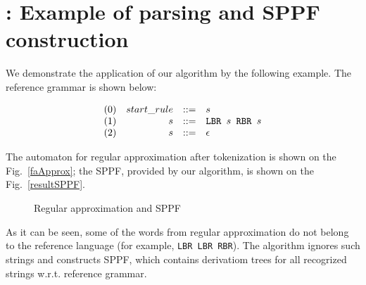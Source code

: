 \appendix

\section{\appendixname: Example of parsing and SPPF construction}\label{example}

We demonstrate the application of our algorithm by the following example. The reference grammar is shown below:

$$
\begin{array}{crcl}
(0)& start\_rule &::=& s \\
(1)& s & ::= & \mbox{\texttt{LBR }} s \mbox{\texttt{ RBR }} s\\
(2)& s & ::= &\epsilon
\end{array}
$$

The automaton for regular approximation after tokenization is shown on the Fig.~\ref{faApprox}; the 
SPPF, provided by our algorithm, is shown on the Fig.~\ref{resultSPPF}.

 \begin{figure}[!ht]
   \hfill
    \caption{Regular approximation and SPPF}
    \label{fig:SPPFforReg}
 \end{figure}


As it can be seen, some of the words from regular approximation do not belong to the reference language (for example, 
\verb|LBR LBR RBR|). The algorithm ignores such strings and constructs SPPF, which contains derivatiom trees 
for all recogrized strings w.r.t. reference grammar.

\pagebreak
